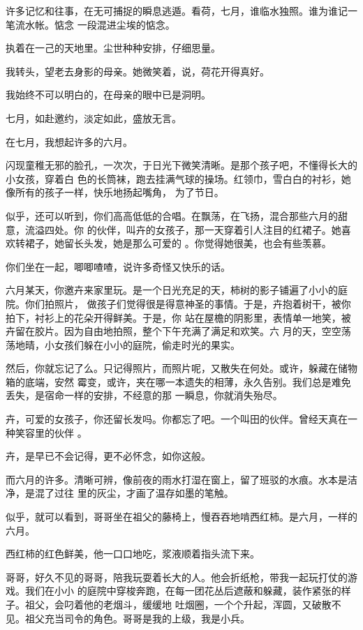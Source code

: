 \documentclass[12pt,a4paper]{article}
\def\blankrev{\vspace{1ex}}									%
\begin{document}
		许多记忆和往事，在无可捕捉的瞬息逃遁。看荷，七月，谁临水独照。谁为谁记一笔流水帐。惦念
	一段混进尘埃的惦念。

		执着在一己的天地里。尘世种种安排，仔细思量。\par
		我转头，望老去身影的母亲。她微笑着，说，荷花开得真好。\par
		我始终不可以明白的，在母亲的眼中已是洞明。\par
		七月，如赴邀约，淡定如此，盛放无言。

	\endwriting



		在七月，我想起许多的六月。

		闪现童稚无邪的脸孔，一次次，于日光下微笑清晰。是那个孩子吧，不懂得长大的小女孩，穿着白
	色的长筒袜，跑去挂满气球的操场。红领巾，雪白白的衬衫，她像所有的孩子一样，快乐地扬起嘴角，
	为了节日。

		似乎，还可以听到，你们高高低低的合唱。在飘荡，在飞扬，混合那些六月的甜意，流溢四处。你
	的伙伴，叫卉的女孩子，那一天穿着引人注目的红裙子。她喜欢转裙子，她留长头发，她是那么可爱的
	。你觉得她很美，也会有些羡慕。

		你们坐在一起，唧唧喳喳，说许多奇怪又快乐的话。

		六月某天，你邀卉来家里玩。是一个日光充足的天，柿树的影子铺遍了小小的庭院。你们拍照片，
	做孩子们觉得很是得意神圣的事情。于是，卉抱着树干，被你拍下，衬衫上的花朵开得鲜美。于是，你
	站在屋檐的阴影里，表情单一地笑，被卉留在胶片。因为自由地拍照，整个下午充满了满足和欢笑。六
	月的天，空空荡荡地晴，小女孩们躲在小小的庭院，偷走时光的果实。

		然后，你就忘记了么。只记得照片，而照片呢，又散失在何处。或许，躲藏在储物箱的底端，安然
	霉变，或许，夹在哪一本遗失的相薄，永久告别。我们总是难免丢失，是宿命一样的安排，不经意的那
	一瞬息，你就消失殆尽。

		卉，可爱的女孩子，你还留长发吗。你都忘了吧。一个叫田的伙伴。曾经天真在一种笑容里的伙伴
	。

		卉，是早已不会记得，更不必怀念，如你这般。

		而六月的许多。清晰可辨，像前夜的雨水打湿在窗上，留了班驳的水痕。水本是洁净，是混了过往
	里的灰尘，才画了温存如墨的笔触。

		\blankrev

		似乎，就可以看到，哥哥坐在祖父的藤椅上，慢吞吞地啃西红柿。是六月，一样的六月。

		西红柿的红色鲜美，他一口口地吃，浆液顺着指头流下来。

		哥哥，好久不见的哥哥，陪我玩耍着长大的人。他会折纸枪，带我一起玩打仗的游戏。我们在小小
	的庭院中穿梭奔跑，在每一团花丛后遮蔽和躲藏，装作紧张的样子。祖父，会叼着他的老烟斗，缓缓地
	吐烟圈，一个个升起，浑圆，又破散不见。祖父充当司令的角色。哥哥是我的上级，我是小兵。
\end{document}

